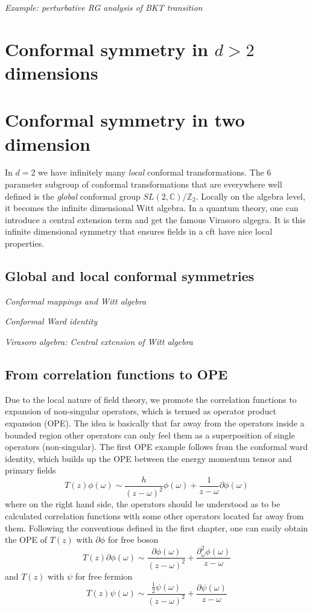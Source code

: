 \documentclass[submission, PhysLectNotes]{SciPost}
\begin{document}
{\it Example: perturbative RG analysis of BKT transition}

\section{Conformal symmetry in $d>2$ dimensions}

\section{Conformal symmetry in two dimension}
In $d=2$ we have infinitely many \emph{local} conformal transformations. The 6 parameter subgroup of conformal transformations that are everywhere well defined is the \emph{global} conformal group $SL(2,\mathbb{C})/\mathbb{Z}_2$. Locally on the algebra level, it becomes the infinite dimensional Witt algebra. In a quantum theory, one can introduce a central extension term and get the famous Virasoro algegra. It is this infinite dimensional symmetry that ensures fields in a cft have nice local properties.

\subsection{Global and local conformal symmetries}

{\it Conformal mappings and Witt algebra}

{\it Conformal Ward identity}

{\it Virasoro algebra: Central extension of Witt algebra}

\subsection{From correlation functions to OPE}
Due to the local nature of field theory, we promote the correlation functions to expansion of non-singular operators, which is termed as operator product expansion (OPE). The idea is basically that far away from the operators inside a bounded region other operators can only feel them as a superposition of single operators (non-singular). The first OPE example follows from the conformal ward identity, which builds up the OPE between the energy momentum tensor and primary fields
\begin{equation}
	T(z) \phi(\omega) \sim \frac{h}{\left(z-\omega\right)^2} \phi(\omega) + \frac{1}{z-\omega} \partial \phi(\omega)
\end{equation}
where on the right hand side, the operators should be understood as to be calculated correlation functions with some other operators located far away from them.  Following the conventions defined in the first chapter, one can easily obtain the OPE of $T(z)$ with $\partial \phi$ for free boson
\begin{equation}
T(z) \partial\phi(\omega) \sim \frac{\partial \phi(\omega)}{\left(z-\omega\right)^2} + \frac{\partial_\omega^2 \phi(\omega)}{z-\omega}
\end{equation}
and $T(z)$ with $\psi$ for free fermion
\begin{equation}
T(z) \psi(\omega) \sim \frac{\frac{1}{2} \psi(\omega)}{\left(z-\omega\right)^2} + \frac{\partial \psi(\omega)}{z-\omega}
\end{equation}
\end{document}
